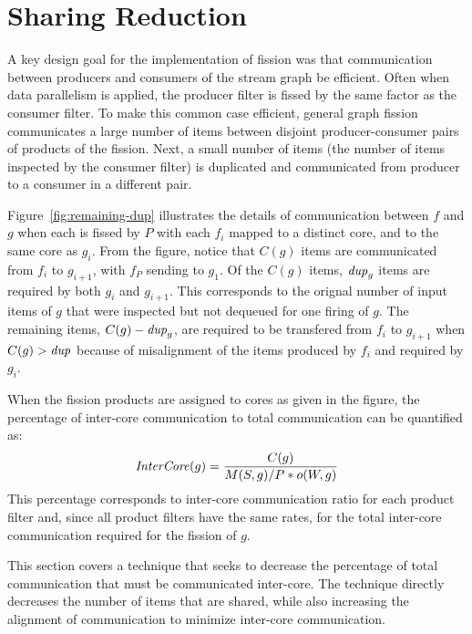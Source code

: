 \section{Sharing Reduction}

A key design goal for the implementation of fission was that
communication between producers and consumers of the stream graph be
efficient.  Often when data parallelism is applied, the producer
filter is fissed by the same factor as the consumer filter.  To make
this common case efficient, general graph fission communicates a large
number of items between disjoint producer-consumer pairs of products
of the fission.  Next, a small number of items (the number of items
inspected by the consumer filter) is duplicated and communicated from
producer to a consumer in a different pair.

Figure~\ref{fig:remaining-dup} illustrates the details of
communication between $f$ and $g$ when each is fissed by $P$ with each
$f_i$ mapped to a distinct core, and to the same core as $g_i$.  From
the figure, notice that $C(g)$ items are communicated from $f_i$ to
$g_{i+ 1}$, with $f_P$ sending to $g_1$.  Of the $C(g)$ items,
$\relax{\it dup}_g$ items are required by both $g_i$ and $g_{i+1}$.  This
corresponds to the orignal number of input items of $g$ that were
inspected but not dequeued for one firing of $g$.  The remaining items,
$C(g) - \relax{\it dup}_g$, are required to be transfered from $f_i$ to
$g_{i+1}$ when $C(g) > \relax{\it dup}$ because of misalignment of the items
produced by $f_i$ and required by $g_i$.

When the fission products are assigned to
cores as given in the figure, the percentage of inter-core
communication to total communication can be quantified as:
{\ninepoint
\begin{equation}
\label{eq:min-dup}
\mt{InterCore}(g) = \frac{C(g)}{M(S,g) / P * o(W, g)}
\end{equation}
}
\noindent This percentage corresponds to inter-core communication
ratio for each product filter and, since all product filters have the
same rates, for the total inter-core communication required for the
fission of $g$.

This section covers a technique that seeks to decrease the percentage
of total communication that must be communicated inter-core.  The
technique directly decreases the number of items that are shared,
while also increasing the alignment of communication to minimize
inter-core communication.

